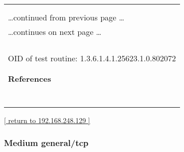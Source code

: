 \documentclass{article}
\begin{document}
\begin{longtable}{|p{}|}
\hline
\rowcolor{openvas_hole}{\color{white}{High (CVSS: 7.5) }}\\
\rowcolor{openvas_hole}{\color{white}{NVT: Lighttpd Multiple vulnerabilities}}\\
\hline
\endfirsthead
\hfill\ldots continued from previous page \ldots \\
\hline
\endhead
\hline
\ldots continues on next page \ldots \\
\endfoot
\hline
\endlastfoot
\\
\rowcolor{white}{\verb==}\\
\rowcolor{white}{\verb==}\\
\\
OID of test routine: 1.3.6.1.4.1.25623.1.0.802072\\
\\

      \hline
      \\
\textbf{References}\\
\rowcolor{white}{\verb=CVE: CVE-2014-2323, CVE-2014-2324=}\\
\rowcolor{white}{\verb=BID:66153, 66157=}\\
\rowcolor{white}{\verb=Other:=}\\
\rowcolor{white}{\verb=  URL:http://osvdb.org/104381=}\\
\rowcolor{white}{\verb=   URL:http://osvdb.org/104382=}\\
\rowcolor{white}{\verb=   URL:http://seclists.org/oss-sec/2014/q1/561=}\\
\rowcolor{white}{\verb=   URL:http://download.lighttpd.net/lighttpd/security/lighttpd_sa_2014_01.txt=}\\
\end{longtable}

\begin{footnotesize}\hyperref[host:192.168.248.129]{[ return to 192.168.248.129 ]}\end{footnotesize}
\subsubsection{Medium general/tcp}
\label{port:192.168.248.129 general/tcp Medium}
\end{document}
